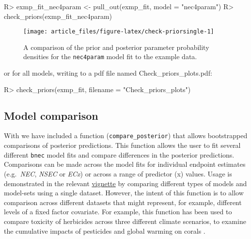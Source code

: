 \documentclass[
]{jss}
\begin{document}
\begin{CodeChunk}
\begin{CodeInput}
R> exmp_fit_nec4param <- pull_out(exmp_fit, model = "nec4param")
R> check_priors(exmp_fit_nec4param)
\end{CodeInput}
\begin{figure}

{\centering \texttt{[image: article\_files/figure-latex/check-priorsingle-1]} 

}

\caption[A comparison of the prior and posterior parameter probability densities for the \texttt{nec4param} model fit to the example data]{A comparison of the prior and posterior parameter probability densities for the \texttt{nec4param} model fit to the example data.}\label{fig:check-priorsingle}
\end{figure}
\end{CodeChunk}

or for all models, writing to a pdf file named Check\_priors\_plots.pdf:

\begin{CodeChunk}
\begin{CodeInput}
R> check_priors(exmp_fit, filename = "Check_priors_plots")
\end{CodeInput}
\end{CodeChunk}

\hypertarget{model-comparison}{%
\subsection{Model comparison}\label{model-comparison}}

With  we have included a function
(\texttt{compare\_posterior}) that allows bootstrapped comparisons of
posterior predictions. This function allows the user to fit several
different \texttt{bnec} model fits and compare differences in the
posterior predictions. Comparisons can be made across the model fits for
individual endpoint estimates (e.g.~\emph{NEC}, \emph{NSEC} or
\emph{ECx}) or across a range of predictor (x) values. Usage is
demonstrated in the relevant
\href{https://open-aims.github.io/bayesnec/articles/example4.html}{vignette}
by comparing different types of models and model-sets using a single
dataset. However, the intent of this function is to allow comparison
across different datasets that might represent, for example, different
levels of a fixed factor covariate. For example, this function has been
used to compare toxicity of herbicides across three different climate
scenarios, to examine the cumulative impacts of pesticides and global
warming on corals \citep{flores2021}.
\end{document}
